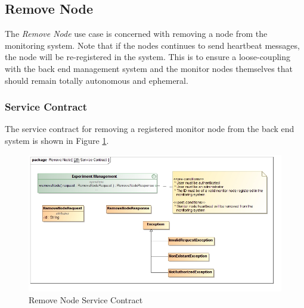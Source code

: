 \subsection {Remove Node}
The \textit{Remove Node} use case is concerned with removing a node from the
monitoring system. Note that if the nodes continues to send heartbeat messages,
the node will be re-registered in the system. This is to ensure a loose-coupling
with the back end management system and the monitor nodes themselves that should
remain totally autonomous and ephemeral.

\subsubsection{Service Contract}
The service contract for removing a registered monitor node from the back end 
system is shown in Figure \ref{fig:removeNodeServiceContract}.
\begin{figure}[H]
  \begin{center}
  \includegraphics[scale=0.38]{../Diagrams and Charts/Experiment/Remove Node Service Contract.jpg}
  \caption{Remove Node Service Contract}
  \label{fig:removeNodeServiceContract}
  \end{center}
\end{figure}

